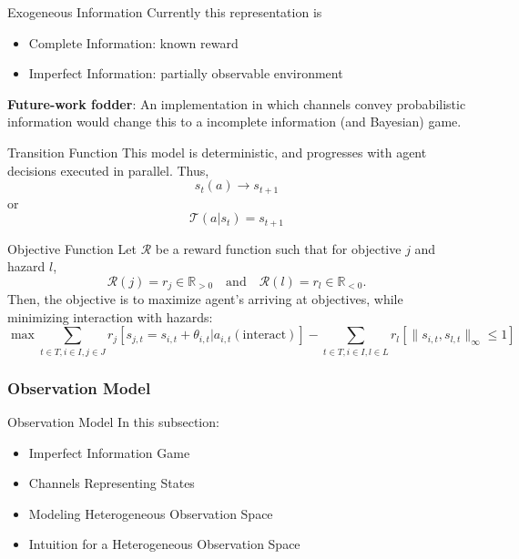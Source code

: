 \begin{frame}{Exogeneous Information}
    Currently this representation is
    \begin{itemize}
        \item Complete Information: known reward
        \item Imperfect Information: partially observable environment
    \end{itemize} 
    \textbf{Future-work fodder}: An implementation in which channels convey probabilistic 
    information would change this to a incomplete information (and Bayesian) game.
\end{frame}

\begin{frame}{Transition Function}
    This model is deterministic, and progresses with agent decisions executed in parallel. 
    Thus,
        \[s_{t}(a) \rightarrow s_{t+1}\]
    or
        \[\mathcal{T}(a|s_{t}) = s_{t+1}\]
\end{frame}

\begin{frame}{Objective Function}
    Let \(\mathcal{R}\) be a reward function such that for objective \(j\)
    and hazard \(l\),
    \[
        \mathcal{R}(j) = r_{j} \in \mathbb{R}_{>0}
        \quad \text{and} \quad
        \mathcal{R}(l) = r_{l} \in \mathbb{R}_{<0}.
    \]
    Then, the objective is to maximize agent's arriving at objectives, 
    while minimizing interaction with hazards:
    \[
        \max \sum_{t\in T,i\in I, j\in J} r_{j}[s_{j,t} = s_{i,t} 
            + \theta_{i,t} | a_{i,t}(\text{interact}) ]
        - \sum_{t\in T,i\in I, l\in L} r_{l}[\|s_{i,t},s_{l,t}\|_\infty \leq 1]
    \]
\end{frame}

\subsubsection{Observation Model}

\begin{frame}{Observation Model}
    In this subsection:
    \begin{itemize}
        \item Imperfect Information Game
        \item Channels Representing States
        \item Modeling Heterogeneous Observation Space
        \item Intuition for a Heterogeneous Observation Space
    \end{itemize}
\end{frame}

